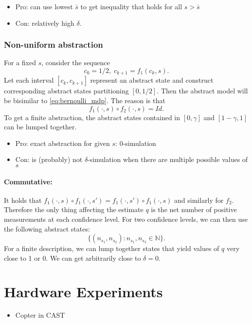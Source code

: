\documentclass[conference]{IEEEtran}
\begin{document}
\begin{itemize}
  \item Pro: can use lowest $\bar s$ to get inequality that holds for all $s > \bar s$
  \item Con: relatively high $\delta$.
\end{itemize}

\subsubsection{Non-uniform abstraction}

For a fixed $s$, consider the sequence
\begin{equation}
  c_0 = 1/2, \; c_{k+1} = f_1(c_k, s).
\end{equation}
Let each interval $[c_k, c_{k+1}]$ represent an abstract state and construct corresponding abstract states partitioning $[0, 1/2]$. Then the abstract model will be bisimilar to \eqref{eq:bernoulli_mdp}. The reason is that 
\begin{equation}
  f_1(\cdot, s) \circ f_2(\cdot, s) = Id.
\end{equation}
To get a finite abstraction, the abstract states contained in $[0, \gamma]$ and $[1- \gamma, 1]$ can be lumped together.

\begin{itemize}
  \item Pro: exact abstraction for given $s$: $0$-simulation
  \item Con: is (probably) not $\delta$-simulation when there are multiple possible values of $s$
\end{itemize}

\paragraph{Commutative:} It holds that $f_1(\cdot, s) \circ f_1(\cdot, s') = f_1(\cdot, s') \circ f_1(\cdot, s)$ and similarly for $f_2$. Therefore the only thing affecting the estimate $q$ is the net number of positive measurements at each confidence level. For two confidence levels, we can then use the following abstract states:
\begin{equation}
  \{ (n_{s_1}, n_{s_2}) : n_{s_1}, n_{s_2} \in \mathbb{N} \}. 
\end{equation}
For a finite description, we can lump together states that yield values of $q$ very close to 1 or 0. We can get arbitrarily close to $\delta = 0$.

\section{Hardware Experiments}

\begin{itemize}
    \item Copter in CAST
\end{itemize}

\printbibliography
\end{document}
